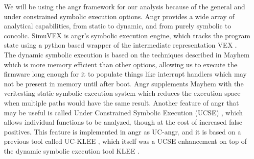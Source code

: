 \documentclass[letterpaper, 10 pt, conference]{ieeeconf}
\begin{document}
We will be using the angr framework \cite{angr} for our analysis because of the general and under constrained symbolic execution options. Angr provides a wide array of analytical capabilities, from static to dynamic, and from purely symbolic to concolic. SimuVEX is angr's symbolic execution engine, which tracks the program state using a python based wrapper \cite{pyvex} of the intermediate representation VEX \cite{vex}. The dynamic symbolic execution is based on the techniques described in Mayhem \cite{mayhem} which is more memory efficient than other options, allowing us to execute the firmware long enough for it to populate things like interrupt handlers which may not be present in memory until after boot. Angr supplements Mayhem with the veritesting static symbolic execution system \cite{veritesting} which reduces the execution space when multiple paths would have the same result. Another feature of angr that may be useful is called Under Constrained Symbolic Execution (UCSE) \cite{ucklee2}, which allows individual functions to be analyzed, though at the cost of increased false positives. This feature is implemented in angr as UC-angr, and it is based on a previous tool called UC-KLEE \cite{ucklee1}, which itself was a UCSE enhancement on top of the dynamic symbolic execution tool KLEE \cite{klee}.

{}

\end{document}
